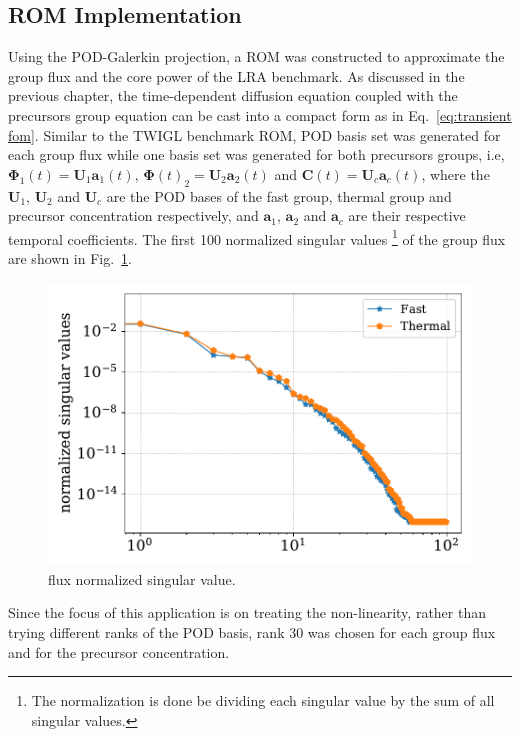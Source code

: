 \documentclass[]{interact}
\theoremstyle{plain}%
\theoremstyle{definition}
\theoremstyle{remark}
\begin{document}
\subsection{ROM Implementation}

Using the POD-Galerkin projection, a ROM was constructed to approximate the group flux and the core power of the LRA benchmark.
As discussed in the previous chapter, the time-dependent diffusion equation coupled with the precursors group equation can be cast into a compact form as in Eq.~\ref{eq:transient fom}.
Similar to the TWIGL benchmark ROM, POD basis set was generated for each group flux while one basis set was generated for both precursors groups, i.e, 
$\mathbf{\Phi}_1(t) = \mathbf{U}_1\mathbf{a}_1(t)$, $\mathbf{\Phi}(t)_2 = \mathbf{U}_2\mathbf{a}_2(t)$ and $\mathbf{C}(t) = \mathbf{U}_c\mathbf{a}_c(t)$, where the $\mathbf{U}_1$, $\mathbf{U}_2$  and $\mathbf{U}_c$ are the POD bases of the fast group, thermal group and precursor concentration respectively, and $\mathbf{a}_1$, $\mathbf{a}_2$ and $\mathbf{a}_c$ are their respective temporal coefficients. 
The first 100 normalized singular values \footnote{The normalization is done be dividing each singular value by the sum of all singular values.} of the group flux are shown in Fig.~\ref{fig:lra singular values}.
\begin{figure}[h!]
	\includegraphics[width=1.0\linewidth]{../figures/LRA_singular_values.pdf}
	\caption{flux normalized singular value.}
	\label{fig:lra singular values}
\end{figure}
Since the focus of this application is on treating the non-linearity, rather than trying different ranks of the POD basis, rank 30 was chosen for each group flux and for the precursor concentration.
\end{document}
